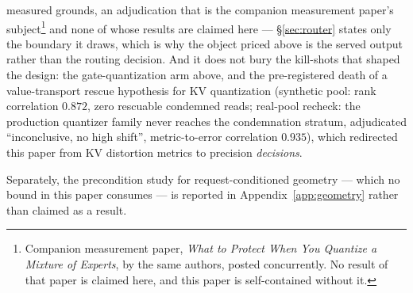 \documentclass[11pt]{article}
\renewcommand{\_}{\WCorigunderscore\allowbreak}
\begin{document}
measured grounds, an adjudication that is the companion measurement
paper's subject\footnote{Companion measurement paper, \emph{What to Protect When You Quantize a Mixture of Experts}, by the same authors, posted concurrently. No result of that paper is claimed here, and this paper is self-contained without it.} and none of whose results are claimed here ---
\S\ref{sec:router} states only the boundary it draws, which is why the
object priced above is the served output rather than the routing
decision. And it does not bury the kill-shots that shaped the design:
the gate-quantization arm above, and the pre-registered death of a
value-transport rescue hypothesis for KV quantization (synthetic pool:
rank correlation $0.872$, zero rescuable condemned reads; real-pool
recheck: the production quantizer family never reaches the condemnation
stratum, adjudicated ``inconclusive, no high shift'', metric-to-error
correlation $0.935$), which redirected this paper from KV distortion
metrics to precision \emph{decisions}.

Separately, the precondition study for request-conditioned geometry ---
which no bound in this paper consumes --- is reported in
Appendix~\ref{app:geometry} rather than claimed as a result.

\begin{table}[htbp]\centering\small
\setlength{\tabcolsep}{4pt}
\caption{Model coverage. The served-output line runs on a
production-scale fine-grained MoE ($256$ experts, top-$6$); the
capacity evaluation on a second, architecturally distinct one; the
routing-certificate arms on smaller greedy-top-$k$ MoEs, treated as a
same-family proxy (\S\ref{sec:router}).}
\label{tab:models}
\end{table}
\end{document}
